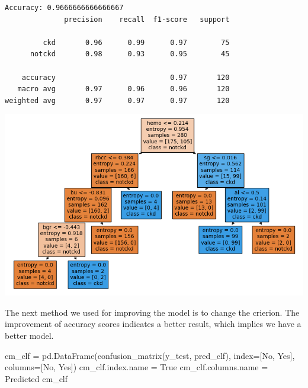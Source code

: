 \documentclass[
  11pt,
  letterpaper,
  DIV=11,
  numbers=noendperiod]{scrartcl}
\newenvironment{Shaded}{\begin{snugshade}}{\end{snugshade}}
\newcommand{\NormalTok}[1]{\textcolor[rgb]{0.00,0.23,0.31}{#1}}
\newcommand{\OperatorTok}[1]{\textcolor[rgb]{0.37,0.37,0.37}{#1}}
\newcommand{\StringTok}[1]{\textcolor[rgb]{0.13,0.47,0.30}{#1}}
\begin{document}
\begin{verbatim}
Accuracy: 0.9666666666666667
              precision    recall  f1-score   support

         ckd       0.96      0.99      0.97        75
      notckd       0.98      0.93      0.95        45

    accuracy                           0.97       120
   macro avg       0.97      0.96      0.96       120
weighted avg       0.97      0.97      0.97       120
\end{verbatim}

\includegraphics{Assignment6_Final version_files/figure-pdf/cell-35-output-2.png}

The next method we used for improving the model is to change the
crierion. The improvement of accuracy scores indicates a better result,
which implies we have a better model.

\begin{Shaded}
\begin{Highlighting}[]
\NormalTok{cm\_clf }\OperatorTok{=}\NormalTok{ pd.DataFrame(confusion\_matrix(y\_test, pred\_clf), index}\OperatorTok{=}\NormalTok{[}\StringTok{\textquotesingle{}No\textquotesingle{}}\NormalTok{, }\StringTok{\textquotesingle{}Yes\textquotesingle{}}\NormalTok{], columns}\OperatorTok{=}\NormalTok{[}\StringTok{\textquotesingle{}No\textquotesingle{}}\NormalTok{, }\StringTok{\textquotesingle{}Yes\textquotesingle{}}\NormalTok{])}
\NormalTok{cm\_clf.index.name }\OperatorTok{=} \StringTok{\textquotesingle{}True\textquotesingle{}}
\NormalTok{cm\_clf.columns.name }\OperatorTok{=} \StringTok{\textquotesingle{}Predicted\textquotesingle{}}
\NormalTok{cm\_clf}
\end{Highlighting}
\end{Shaded}
\end{document}
